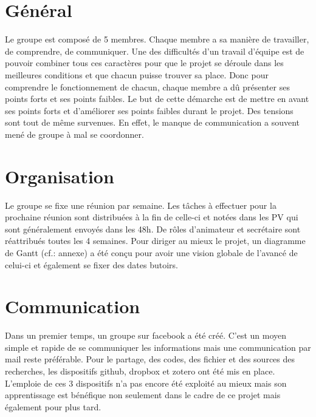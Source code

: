 \section{Général}

Le groupe est composé de 5 membres. Chaque membre a sa manière de travailler, de comprendre, de communiquer. Une des difficultés d'un travail d'équipe est de pouvoir combiner tous ces caractères pour que le projet se déroule dans les meilleures conditions et que chacun puisse trouver sa place. Donc pour comprendre le fonctionnement de chacun, chaque membre a dû présenter ses points forts et ses points faibles. Le but de cette démarche est de mettre en avant ses points forts et d'améliorer ses points faibles durant le projet. Des tensions sont tout de même survenues. En effet, le manque de communication a souvent mené de groupe à mal se coordonner.

\section{Organisation}

Le groupe se fixe une réunion par semaine. Les tâches à effectuer pour la prochaine réunion sont distribuées à la fin de celle-ci et notées dans les PV qui sont généralement envoyés dans les 48h. De rôles d'animateur et secrétaire sont réattribués toutes les 4 semaines. Pour diriger au mieux le projet, un diagramme de Gantt (cf.: annexe) a été conçu pour avoir une vision globale de l'avancé de celui-ci et également se fixer des dates butoirs.

\section{Communication}

Dans un premier temps, un groupe sur facebook a été créé. C'est un moyen simple et rapide de se communiquer les informations mais une communication par mail reste préférable. Pour le partage, des codes, des fichier et des sources des recherches, les dispositifs github, dropbox et zotero ont été mis en place. L'emploie de ces 3 dispositifs n'a pas encore été exploité au mieux mais son apprentissage est bénéfique non seulement dans le cadre de ce projet mais également pour plus tard. 